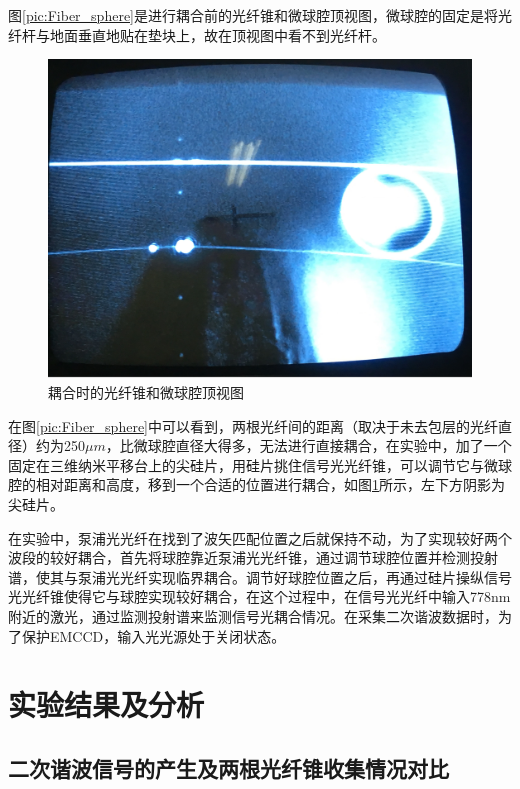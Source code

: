 \documentclass[UTF8,a4paper,cs4size,hyperref]{ctexart}
\begin{document}
图\ref{pic:Fiber_sphere}是进行耦合前的光纤锥和微球腔顶视图，微球腔的固定是将光纤杆与地面垂直地贴在垫块上，故在顶视图中看不到光纤杆。

\begin{figure}
\centering
\includegraphics[width=16cm ]{coupling}
\caption{耦合时的光纤锥和微球腔顶视图}
\label{pic:coupling}
\end{figure}

在图\ref{pic:Fiber_sphere}中可以看到，两根光纤间的距离（取决于未去包层的光纤直径）约为250$\mu m$，比微球腔直径大得多，无法进行直接耦合，在实验中，加了一个固定在三维纳米平移台上的尖硅片，用硅片挑住信号光光纤锥，可以调节它与微球腔的相对距离和高度，移到一个合适的位置进行耦合，如图\ref{pic:coupling}所示，左下方阴影为尖硅片。

在实验中，泵浦光光纤在找到了波矢匹配位置之后就保持不动，为了实现较好两个波段的较好耦合，首先将球腔靠近泵浦光光纤锥，通过调节球腔位置并检测投射谱，使其与泵浦光光纤实现临界耦合。调节好球腔位置之后，再通过硅片操纵信号光光纤锥使得它与球腔实现较好耦合，在这个过程中，在信号光光纤中输入778nm附近的激光，通过监测投射谱来监测信号光耦合情况。在采集二次谐波数据时，为了保护EMCCD，输入光光源处于关闭状态。

\section{实验结果及分析}

\subsection{二次谐波信号的产生及两根光纤锥收集情况对比}
\end{document}
